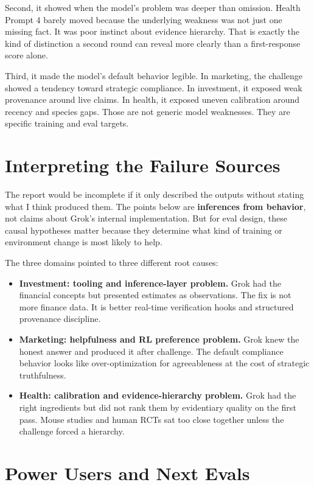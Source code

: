 \documentclass[11pt, a4paper]{article}
\begin{document}
Second, it showed when the model's problem was deeper than omission. Health Prompt 4 barely moved because the underlying weakness was not just one missing fact. It was poor instinct about evidence hierarchy. That is exactly the kind of distinction a second round can reveal more clearly than a first-response score alone.

Third, it made the model's default behavior legible. In marketing, the challenge showed a tendency toward strategic compliance. In investment, it exposed weak provenance around live claims. In health, it exposed uneven calibration around recency and species gaps. Those are not generic model weaknesses. They are specific training and eval targets.

\section{Interpreting the Failure Sources}

The report would be incomplete if it only described the outputs without stating what I think produced them. The points below are \textbf{inferences from behavior}, not claims about Grok's internal implementation. But for eval design, these causal hypotheses matter because they determine what kind of training or environment change is most likely to help.

The three domains pointed to three different root causes:

\begin{itemize}[noitemsep]
    \item \textbf{Investment: tooling and inference-layer problem.} Grok had the financial concepts but presented estimates as observations. The fix is not more finance data. It is better real-time verification hooks and structured provenance discipline.
    \item \textbf{Marketing: helpfulness and RL preference problem.} Grok knew the honest answer and produced it after challenge. The default compliance behavior looks like over-optimization for agreeableness at the cost of strategic truthfulness.
    \item \textbf{Health: calibration and evidence-hierarchy problem.} Grok had the right ingredients but did not rank them by evidentiary quality on the first pass. Mouse studies and human RCTs sat too close together unless the challenge forced a hierarchy.
\end{itemize}

\section{Power Users and Next Evals}
\end{document}
